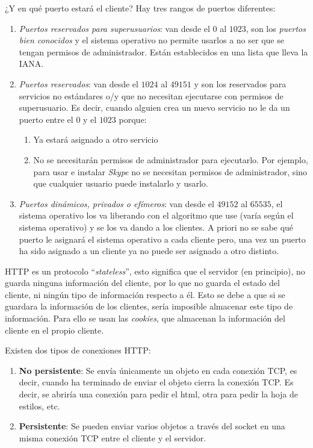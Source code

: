 \documentclass[10pt,a4paper,spanish]{report}
\begin{document}
¿Y en qué puerto estará el cliente? Hay tres rangos de puertos diferentes:
\begin{enumerate}[\color{tema2}{$\heartsuit$}]
\label{portskind}
  \item \textit{\textcolor{tema2}{Puertos reservados para superusuarios}}: van desde el $0$ al $1023$, son los \textit{\textcolor{tema2}{puertos bien conocidos}} y el sistema operativo no permite usarlos a no ser que se tengan permisos de administrador. Están establecidos en una lista que lleva la IANA.
  \item \textit{\textcolor{tema2}{Puertos reservados}}: van desde el $1024$ al $49151$ y son los reservados para servicios no estándares o/y que no necesitan ejecutarse con permisos de superusuario. Es decir, cuando alguien crea un nuevo servicio no le da un puerto entre el $0$ y el $1023$ porque:
  \begin{enumerate}[---]
    \item Ya estará asignado a otro servicio
    \item No se necesitarán permisos de administrador para ejecutarlo. Por ejemplo, para usar e instalar \textit{\textcolor{tema2}{Skype}} no se necesitan permisos de administrador, sino que cualquier usuario puede instalarlo y usarlo.
  \end{enumerate}
  \item \textit{\textcolor{tema2}{Puertos dinámicos, privados o efímeros}}: van desde el $49152$ al $65535$, el sistema operativo los va liberando con el algoritmo que use (varía según el sistema operativo) y se los va dando a los clientes. A priori no se sabe qué puerto le asignará el sistema operativo a cada cliente pero, una vez un puerto ha sido asignado a un cliente ya no puede ser asignado a otro distinto.
\end{enumerate}

HTTP es un protocolo ``\textit{\textcolor{tema2}{stateless}}'', esto significa que el servidor (en principio), no guarda ninguna información del cliente, por lo que no guarda el estado del cliente, ni ningún tipo de información respecto a él. Esto se debe a que si se guardara la información de los clientes, sería imposible almacenar este tipo de información. Para ello se usan las \textit{\textcolor{tema2}{cookies}}, que almacenan la información del cliente en el propio cliente.

Existen dos tipos de conexiones HTTP:

\begin{enumerate}[---]
  \item \textbf{\textcolor{tema2}{No persistente}}: Se envía únicamente un objeto en cada conexión TCP, es decir, cuando ha terminado de enviar el objeto cierra la conexión TCP. Es decir, se abriría una conexión para pedir el html, otra para pedir la hoja de estilos, etc.
  \item \textbf{\textcolor{tema2}{Persistente}}: Se pueden enviar varios objetos a través del socket en una misma conexión TCP entre el cliente y el servidor.
\end{enumerate}
\end{document}
